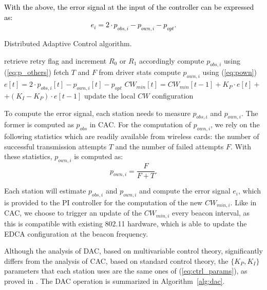 \documentclass[a4paper,10pt]{article}
\newcommand{\revs}[1]{\textcolor{black}{#1}}
\begin{document}
\revs{
With the above, the error signal at the input of the controller can be expressed as:
\begin{equation}
\label{eq:e_dac}
e_i = 2\cdot p_{obs,i} - p_{own,i} - p_{opt}.
\end{equation}
}


\begin{algorithm}[!t]
 \caption{Distributed Adaptive Control algorithm.}
 \label{alg:dac}
 \begin{algorithmic}[1]
		\Repeat
					\State retrieve retry flag and 
					\State increment $R_0$ or $R_1$ accordingly
			\EndIf
		\State compute $p_{obs,i}$ using (\ref{eq:p_others}) 	
		\State fetch $T$ and $F$ from driver stats
		\State compute $p_{own,i}$ using (\ref{eq:pown})
		\State $e[t] = 2\cdot p_{obs,i}[t]-p_{own,i}[t]-p_{opt}$	
		\State $CW_{min}[t] = CW_{min}[t - 1] + K_P \cdot e[t] + $
		\State \hspace{4.2em} $ + (K_I - K_P) \cdot e[t - 1]$
		\State update the local $CW$ configuration
	\EndWhile
\end{algorithmic}
\end{algorithm}

To compute the error signal, each station needs to measure $p_{obs,i}$ and $p_{own,i}$. The former is computed as $p_{obs}$ in CAC. For the computation of $p_{own,i}$, we rely on the following statistics which are readily available from wireless cards: the number of successful transmission attempts $T$ and the number of failed attempts $F$. With these statistics, $p_{own,i}$ is computed as:
\begin{equation} 
\label{eq:pown}
p_{own,i} = \frac{F}{F+T}.
\end{equation}

Each station will estimate $p_{obs,i}$ and $p_{own,i}$ and compute the error signal $e_i$, which is provided to the PI controller for the computation of the new $CW_{min,i}$. Like in CAC, we choose to trigger an update of the $CW_{min,i}$ every beacon interval, as this is compatible with existing 802.11 hardware, which is able to update the EDCA configuration at the beacon frequency. 

Although the analysis of DAC, based on multivariable control theory, significantly differs from the analysis of CAC, based on standard control theory, the $\{K_P, K_I\}$ parameters that each station uses are the same ones of (\ref{eq:ctrl_params}), as proved in \cite{patras10tmc}. The DAC operation is summarized in Algorithm~\ref{alg:dac}.
\end{document}
